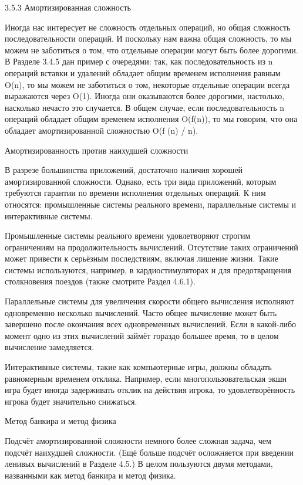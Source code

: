 3.5.3 Амортизированная сложность

Иногда нас интересует не сложность отдельных операций, но общая сложность последовательности операций. И поскольку нам важна общая сложность, то мы можем не заботиться о том, что отдельные операции могут быть более дорогими. В Разделе 3.4.5 дан пример с очередями: так, как последовательность из n операций вставки и удалений обладает общим временем исполнения равным O(n), то мы можем не заботиться о том, некоторые отдельные операции всегда выражаются через O(1). Иногда они оказываются более дорогими, настолько, насколько нечасто это случается. В общем случае, если последовательность n операций обладает общим временем исполнения O(f(n)), то мы говорим, что она обладает амортизированной сложностью O(f (n) / n).

Амортизированность против наихудшей сложности

В разрезе большинства приложений, достаточно наличия хорошей амортизированной сложности. Однако, есть три вида приложений, которым требуются гарантии по времени исполнения отдельных операций. К ним относятся: промышленные системы реального времени, параллельные системы и интерактивные системы.

Промышленные системы реального времени удовлетворяют строгим ограничениям на продолжительность вычислений. Отсутствие таких ограничений может привести к серьёзным последствиям, включая лишение жизни. Такие системы используются, например, в кардиостимуляторах и для предотвращения столкновения поездов (также смотрите Раздел 4.6.1).

Параллельные системы для увеличения скорости общего вычисления исполняют одновременно несколько вычислений. Часто общее вычисление может быть завершено после окончания всех одновременных вычислений. Если в какой-либо момент одно из этих вычислений займёт гораздо большее время, то в целом вычисление замедляется.

Интерактивные системы, такие как компьютерные игры, должны обладать равномерным временем отклика. Например, если многопользовательская экшн игра будет иногда задерживать отклик на действия игрока, то удовлетворённость игрока будет значительно снижаться.

Метод банкира и метод физика

Подсчёт амортизированной сложности немного более сложная задача, чем подсчёт наихудшей сложности. (Ещё больше подсчёт осложняется при введении ленивых вычислений в Разделе 4.5.) В целом пользуются двумя методами, названными как метод банкира и метод физика.

